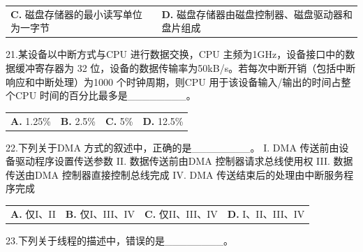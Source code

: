 \documentclass[UTF8,11pt]{ctexart}
\begin{document}
\begin{center}\begin{tabular}{>{\raggedright\arraybackslash}p{\dimexpr(\linewidth-4\tabcolsep)/2\relax}>{\raggedright\arraybackslash}p{\dimexpr(\linewidth-4\tabcolsep)/2\relax}}
\textbf{C.} 磁盘存储器的最小读写单位为一字节 & \textbf{D.} 磁盘存储器由磁盘控制器、磁盘驱动器和盘片组成\\[.35em]\end{tabular}\end{center}

21.某设备以中断方式与CPU 进行数据交换，CPU 主频为1GHz，设备接口中的数据缓冲寄存器为 32 位，设备的数据传输率为50kB/s。若每次中断开销（包括中断响应和中断处理）为1000 个时钟周期，则CPU 用于该设备输入/输出的时间占整个CPU 时间的百分比最多是\_\_\_\_\_\_\_\_。


\begin{center}\begin{tabular}{>{\raggedright\arraybackslash}p{\dimexpr(\linewidth-8\tabcolsep)/4\relax}>{\raggedright\arraybackslash}p{\dimexpr(\linewidth-8\tabcolsep)/4\relax}>{\raggedright\arraybackslash}p{\dimexpr(\linewidth-8\tabcolsep)/4\relax}>{\raggedright\arraybackslash}p{\dimexpr(\linewidth-8\tabcolsep)/4\relax}}
\textbf{A.} 1.\allowbreak{}25\% & \textbf{B.} 2.\allowbreak{}5\% & \textbf{C.} 5\% & \textbf{D.} 12.\allowbreak{}5\%\\[.35em]\end{tabular}\end{center}

22.下列关于DMA 方式的叙述中，正确的是\_\_\_\_\_\_\_\_。 I. DMA 传送前由设备驱动程序设置传送参数 II. 数据传送前由DMA 控制器请求总线使用权 III. 数据传送由DMA 控制器直接控制总线完成 IV. DMA 传送结束后的处理由中断服务程序完成


\begin{center}\begin{tabular}{>{\raggedright\arraybackslash}p{\dimexpr(\linewidth-8\tabcolsep)/4\relax}>{\raggedright\arraybackslash}p{\dimexpr(\linewidth-8\tabcolsep)/4\relax}>{\raggedright\arraybackslash}p{\dimexpr(\linewidth-8\tabcolsep)/4\relax}>{\raggedright\arraybackslash}p{\dimexpr(\linewidth-8\tabcolsep)/4\relax}}
\textbf{A.} 仅I、II & \textbf{B.} 仅I、III、IV & \textbf{C.} 仅II、III、IV & \textbf{D.} I、II、III、IV\\[.35em]\end{tabular}\end{center}

23.下列关于线程的描述中，错误的是\_\_\_\_\_\_\_\_。
\end{document}
